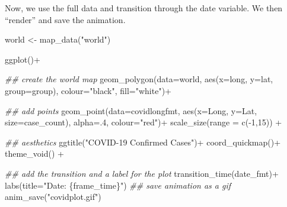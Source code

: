 \documentclass[
  letterpaper,
  DIV=11,
  numbers=noendperiod]{scrreprt}
\newenvironment{Shaded}{\begin{snugshade}}{\end{snugshade}}
\newcommand{\AttributeTok}[1]{\textcolor[rgb]{0.40,0.45,0.13}{#1}}
\newcommand{\DecValTok}[1]{\textcolor[rgb]{0.68,0.00,0.00}{#1}}
\newcommand{\DocumentationTok}[1]{\textcolor[rgb]{0.37,0.37,0.37}{\textit{#1}}}
\newcommand{\FunctionTok}[1]{\textcolor[rgb]{0.28,0.35,0.67}{#1}}
\newcommand{\NormalTok}[1]{\textcolor[rgb]{0.00,0.23,0.31}{#1}}
\newcommand{\OtherTok}[1]{\textcolor[rgb]{0.00,0.23,0.31}{#1}}
\newcommand{\SpecialCharTok}[1]{\textcolor[rgb]{0.37,0.37,0.37}{#1}}
\newcommand{\StringTok}[1]{\textcolor[rgb]{0.13,0.47,0.30}{#1}}
\begin{document}
Now, we use the full data and transition through the date variable. We
then ``render'' and save the animation.

\begin{Shaded}
\begin{Highlighting}[]
\NormalTok{world }\OtherTok{\textless{}{-}} \FunctionTok{map\_data}\NormalTok{(}\StringTok{"world"}\NormalTok{)}

\FunctionTok{ggplot}\NormalTok{()}\SpecialCharTok{+}
  
  \DocumentationTok{\#\# create the world map}
  \FunctionTok{geom\_polygon}\NormalTok{(}\AttributeTok{data=}\NormalTok{world, }\FunctionTok{aes}\NormalTok{(}\AttributeTok{x=}\NormalTok{long, }\AttributeTok{y=}\NormalTok{lat, }\AttributeTok{group=}\NormalTok{group), }\AttributeTok{colour=}\StringTok{"black"}\NormalTok{, }\AttributeTok{fill=}\StringTok{"white"}\NormalTok{)}\SpecialCharTok{+}
  
  \DocumentationTok{\#\# add points}
  \FunctionTok{geom\_point}\NormalTok{(}\AttributeTok{data=}\NormalTok{covidlongfmt, }\FunctionTok{aes}\NormalTok{(}\AttributeTok{x=}\NormalTok{Long, }\AttributeTok{y=}\NormalTok{Lat, }\AttributeTok{size=}\NormalTok{case\_count), }\AttributeTok{alpha=}\NormalTok{.}\DecValTok{4}\NormalTok{, }\AttributeTok{colour=}\StringTok{"red"}\NormalTok{)}\SpecialCharTok{+}
  \FunctionTok{scale\_size}\NormalTok{(}\AttributeTok{range =} \FunctionTok{c}\NormalTok{(}\SpecialCharTok{{-}}\DecValTok{1}\NormalTok{,}\DecValTok{15}\NormalTok{)) }\SpecialCharTok{+}
  
  \DocumentationTok{\#\# aesthetics}
  \FunctionTok{ggtitle}\NormalTok{(}\StringTok{"COVID{-}19 Confirmed Cases"}\NormalTok{)}\SpecialCharTok{+}
  \FunctionTok{coord\_quickmap}\NormalTok{()}\SpecialCharTok{+}
  \FunctionTok{theme\_void}\NormalTok{() }\SpecialCharTok{+}
  
  \DocumentationTok{\#\# add the transition and a label for the plot}
  \FunctionTok{transition\_time}\NormalTok{(date\_fmt)}\SpecialCharTok{+}
  \FunctionTok{labs}\NormalTok{(}\AttributeTok{title=}\StringTok{"Date: \{frame\_time\}"}\NormalTok{)}
\DocumentationTok{\#\# save animation as a gif}
\FunctionTok{anim\_save}\NormalTok{(}\StringTok{"covidplot.gif"}\NormalTok{)}
\end{Highlighting}
\end{Shaded}
\end{document}
